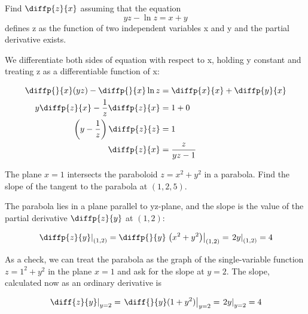 \documentclass[12pt,a4paper]{article}
\begin{document}
\begin{example}
    Find \(\diffp{z}{x}\) assuming that the equation
    \[yz -\ln z = x+y\]
    defines z as the function of two independent variables x and y and the partial derivative exists.
\end{example}

\begin{solution}
    We differentiate both sides of equation with respect to x, holding y constant and treating z as a differentiable function of x:

    \begin{align*}
        \diffp{}{x}(yz) - \diffp{}{x}\ln z &= \diffp{x}{x} +\diffp{y}{x}\\
        y \diffp{z}{x} - \frac{1}{z} \diffp{z}{x} &= 1 + 0\\
        \left(y - \frac{1}{z}\right) \diffp{z}{z} &= 1\\
        \diffp{z}{x} &= \frac{z}{yz-1}
    \end{align*}
    

\end{solution}

\newpage

\begin{example}
    The plane \(x=1\) intersects the paraboloid \(z = x^2 + y^2\) in a parabola.
    Find the slope of the tangent to the parabola at \((1,2,5)\).
    


    \begin{solution}
        The parabola lies in a plane parallel to yz-plane, and the slope is the value of the partial derivative \(\diffp{z}{y}\) at \((1,2)\):

        \[\left. \diffp{z}{y} \right|_{(1,2)} = \diffp{}{y} \left. \left(x^2 + y^2\right)\right|_{(1,2)} = \left. 2y \right|_{(1,2)} = 4\]

        As a check, we can treat the parabola as the graph of the single-variable function \(z= 1^2 + y^2 \) in the plane \(x = 1\) and ask for the slope at \(y=2\). The slope, 
        calculated now as an ordinary derivative is 

        \[\left. \diff{z}{y}\right|_{y=2} =  \left. \diff{}{y}(1+y^2) \right|_{y=2} =  \left. 2y\right|_{y=2} = 4\]

    \end{solution}

    


\end{example}
\end{document}
